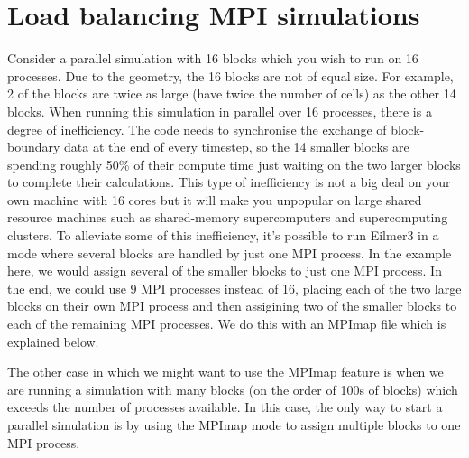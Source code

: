 \section{Load balancing MPI simulations}
\label{app:load-balance}

Consider a parallel simulation with 16 blocks which you wish
to run on 16 processes.
Due to the geometry, the 16 blocks are not of equal size.
For example, 2 of the blocks are twice as large (have twice the
number of cells) as the other 14 blocks.
When running this simulation in parallel over 16 processes,
there is a degree of inefficiency.
The code needs to synchronise the exchange of block-boundary
data at the end of every timestep, so the 14 smaller blocks
are spending roughly 50\% of their compute time just waiting 
on the two larger blocks to complete their calculations.
This type of inefficiency is not a big deal on your own
machine with 16 cores but it will make you unpopular on
large shared resource machines such as shared-memory supercomputers
and supercomputing clusters.
To alleviate some of this inefficiency, it's possible
to run Eilmer3 in a mode where several blocks are handled by
just one MPI process.
In the example here, we would assign several of the smaller
blocks to just one MPI process.
In the end, we could use 9 MPI processes instead of 16, placing
each of the two large blocks on their own MPI process and then
assigining two of the smaller blocks to each of the remaining
MPI processes.
We do this with an MPImap file which is explained below.

The other case in which we might want to use the MPImap feature
is when we are running a simulation with many blocks (on the order
of 100s of blocks) which exceeds the number of processes
available.
In this case, the only way to start a parallel simulation
is by using the MPImap mode to assign multiple blocks
to one MPI process.

